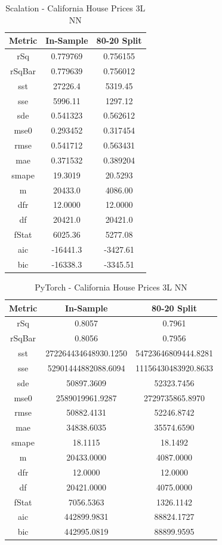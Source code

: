 \documentclass{article}
\begin{document}
\begin{table}[H]
\centering
\caption{Scalation - California House Prices 3L NN}
\label{tab:Scalation - California House Prices 3L NN}
\begin{tabular}{|c|c|c|} \hline 
Metric & In-Sample & 80-20 Split \\ \hline \hline 
rSq &0.779769 & 0.756155 \\ \hline 
rSqBar &0.779639 &      0.756012 \\ \hline 
sst &27226.4 &  5319.45 \\ \hline 
sse &5996.11 &  1297.12 \\ \hline 
sde &0.541323 & 0.562612 \\ \hline 
mse0 &0.293452 &        0.317454 \\ \hline 
rmse &0.541712 &        0.563431 \\ \hline 
mae &0.371532 & 0.389204 \\ \hline 
smape &19.3019 &        20.5293 \\ \hline 
m &20433.0 &    4086.00 \\ \hline 
dfr &12.0000 &  12.0000 \\ \hline 
df &20421.0 &   20421.0 \\ \hline 
fStat &6025.36 &        5277.08 \\ \hline 
aic &-16441.3 & -3427.61 \\ \hline 
bic &-16338.3 & -3345.51 \\ \hline 
\end{tabular}
\end{table}

\begin{table}[H]
\centering
\caption{PyTorch - California House Prices 3L NN}
\label{tab:PyTorch - California House Prices 3L NN}
\begin{tabular}{|c|c|c|}\hline
Metric & In-Sample & 80-20 Split \\ \hline \hline
rSq & 0.8057 & 0.7961 \\ \hline
rSqBar & 0.8056 & 0.7956 \\ \hline
sst & 272264434648930.1250 & 54723646809444.8281 \\ \hline
sse & 52901444882088.6094 & 11156430483920.8633 \\ \hline
sde & 50897.3609 & 52323.7456 \\ \hline
mse0 & 2589019961.9287 & 2729735865.8970 \\ \hline
rmse & 50882.4131 & 52246.8742 \\ \hline
mae & 34838.6035 & 35574.6590 \\ \hline
smape & 18.1115 & 18.1492 \\ \hline
m & 20433.0000 & 4087.0000 \\ \hline
dfr & 12.0000 & 12.0000 \\ \hline
df & 20421.0000 & 4075.0000 \\ \hline
fStat & 7056.5363 & 1326.1142 \\ \hline
aic & 442899.9831 & 88824.1727 \\ \hline
bic & 442995.0819 & 88899.9595 \\ \hline
\end{tabular}
\end{table}
\end{document}
